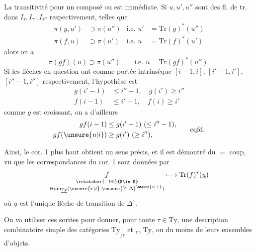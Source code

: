 La transitivité pour un composé
ou
est immédiate. Si $u,u',u''$ sont des fl. de tr.
dans $I_\tau,I_{\tau'},I_{\tau''}$ respectivement, telles que
\[
\begin{aligned}
\pi(g,u')&\supset\pi(u'') &\text{i.e. } u'&=\mathrm{Tr}(g)^*(u'')\\
\pi(f,u)&\supset\pi(u') &\text{i.e. } u&=\mathrm{Tr}(f)^*(u')
\end{aligned}
\]
alors on a
\[
\pi(gf)(u)\supset\pi(u'')\qquad\text{i.e. }u=\mathrm{Tr}(gf)^*(u'').
\]
 Si les flèches en question ont comme portée
intrinsèque $[i-1,i]$, $[i'-1,i']$, $[i''-1,i'']$ respectivement,
l'hypothèse est
\[
\begin{aligned}
 g(i'-1)&\leq i''-1,\quad g(i')\geq i''\\
 f(i-1)&\leq i'-1,\quad f(i)\geq i'
\end{aligned}
\]
 comme $g$ est croissant, on a d'ailleurs
\[
\begin{aligned}
 gf(i-1)&\leq g(i'-1)\ (\leq i''-1),\\
 gf(\unsure{u|i})&\geq g(i')\ (\geq i''),
\end{aligned}
\qquad\text{cqfd.}
\]

Ainsi, le cor. 1 plus haut obtient un sens précis,
et il est démontré du $=$ coup, vu que les
correspondances du cor. 1 sont données par
\[
\underset{\substack{\rotatebox{-90}{$\in$}\\
\operatorname{Hom}_{\underline{\mathrm{Ty}}}(\unsure{\tau|t},\unsure{\mathbb{\Delta}|\Delta}^{\unsure{\varepsilon|+}})}}{f}
\longmapsto\mathrm{Tr}(f)^*(\underline{u})
\]
où $\underline{u}$ est l'unique flèche de transition de $\mathbb{\Delta}^\varepsilon$.

On va utiliser ces sorites pour donner,
pour toute $\tau\in\mathrm{Ty}$, une description combinatoire
simple des catégories $\underline{\mathrm{Ty}}_{/\tau}$ et $ {}_{\tau\backslash}\underline{\mathrm{Ty}}$, ou du
moins de leurs ensembles d'objets.

